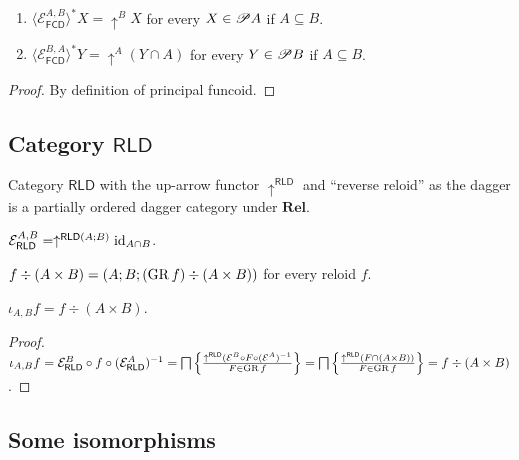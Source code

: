 \begin{prop}
  ~
  \begin{enumerate}
    \item $\langle \mathcal{E}_{\mathsf{FCD}}^{A,B} \rangle^{\ast} X
    = \uparrow^B X$ for every $X \in \mathscr{P} A$ if $A \subseteq B$.
    
    \item $\langle \mathcal{E}_{\mathsf{FCD}}^{B,A} \rangle^{\ast}
    Y = \uparrow^A (Y \cap A)$ for every $Y \in \mathscr{P} B$ if $A \subseteq
    B$.
  \end{enumerate}
\end{prop}

\begin{proof}
  By definition of principal funcoid.
\end{proof}

\subsection{\texorpdfstring{Category $\mathsf{RLD}$}{Category RLD}}

Category $\mathsf{RLD}$ with the up-arrow functor
$\uparrow^{\mathsf{RLD}}$ and ``reverse reloid'' as the dagger is a
partially ordered dagger category under $\mathbf{Rel}$.

\begin{obvious}
$\mathcal{E}_{\mathsf{RLD}}^{A,B} = \uparrow^{\mathsf{RLD} (A ;
B)} \operatorname{id}_{A \cap B}$.
\end{obvious}

\begin{defn}
  $f \div (A \times B) = (A ; B ; (\operatorname{GR} f) \div (A \times B))$ for every
  reloid $f$.
\end{defn}

\begin{prop}
  $\iota_{A, B} f = f \div (A \times B)$.
\end{prop}

\begin{proof}
  $\iota_{A, B} f = \mathcal{E}_{\mathsf{RLD}}^{B}
\circ f \circ (\mathcal{E}_{\mathsf{RLD}}^{A})^{-1} =
\bigsqcap \left\{ \frac{ \uparrow^{\mathsf{RLD}} (\mathcal{E}^{B} \circ F \circ (\mathcal{E}^{A})^{-1}
}{ F \in \operatorname{GR} f }\right\} = \bigsqcap \left\{ \frac{
\uparrow^{\mathsf{RLD}} (F \cap (A \times B))}{F \in \operatorname{GR} f }\right\} = f \div (A \times B)$.

\end{proof}

\subsection{Some isomorphisms}

